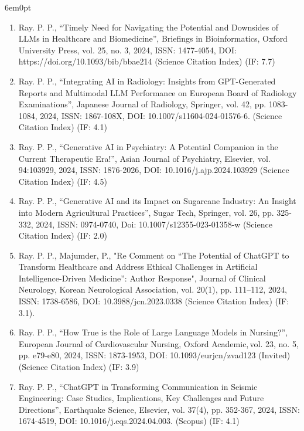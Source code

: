 \documentclass[11pt,a4paper]{moderncv}
\begin{document}
\begin{adjustwidth}{6em}{0pt}
\begin{enumerate}
		\item Ray. P. P., “Timely Need for Navigating the Potential and Downsides of LLMs in Healthcare and Biomedicine”, Briefings in Bioinformatics, Oxford University Press, vol. 25, no. 3, 2024, ISSN: 1477-4054, DOI: https://doi.org/10.1093/bib/bbae214 (Science Citation Index) (IF: 7.7)
		
		\item Ray. P. P., “Integrating AI in Radiology: Insights from GPT-Generated Reports and Multimodal LLM Performance on European Board of Radiology Examinations”, Japanese Journal of Radiology, Springer, vol. 42, pp. 1083-1084, 2024, ISSN: 1867-108X, DOI: 10.1007/s11604-024-01576-6. (Science Citation Index) (IF: 4.1)
		
		\item Ray. P. P., “Generative AI in Psychiatry: A Potential Companion in the Current Therapeutic Era!”, Asian Journal of Psychiatry, Elsevier, vol. 94:103929, 2024, ISSN: 1876-2026, DOI: 10.1016/j.ajp.2024.103929 (Science Citation Index) (IF: 4.5)
		
		\item Ray. P. P., “Generative AI and its Impact on Sugarcane Industry: An Insight into Modern Agricultural Practices”, Sugar Tech, Springer, vol. 26, pp. 325-332, 2024, ISSN: 0974-0740, Doi: 10.1007/s12355-023-01358-w (Science Citation Index) (IF: 2.0)
		
		\item Ray. P. P., Majumder, P., "Re Comment on “The Potential of ChatGPT to Transform Healthcare and Address Ethical Challenges in Artificial Intelligence-Driven Medicine”: Author Response", Journal of Clinical Neurology, Korean Neurological Association, vol. 20(1), pp. 111–112, 2024, ISSN: 1738-6586, DOI: 10.3988/jcn.2023.0338 (Science Citation Index) (IF: 3.1). 
		
		\item Ray. P. P., “How True is the Role of Large Language Models in Nursing?”, European Journal of Cardiovascular Nursing, Oxford Academic, vol. 23, no. 5, pp. e79-e80, 2024, ISSN: 1873-1953, DOI: 10.1093/eurjcn/zvad123 (Invited) (Science Citation Index) (IF: 3.9)
		
		\item Ray. P. P., “ChatGPT in Transforming Communication in Seismic Engineering: Case Studies, Implications, Key Challenges and Future Directions”, Earthquake Science, Elsevier, vol. 37(4), pp. 352-367, 2024, ISSN: 1674-4519, DOI: 10.1016/j.eqs.2024.04.003. (Scopus) (IF: 4.1)
		

\end{enumerate}
\end{adjustwidth}
\end{document}

